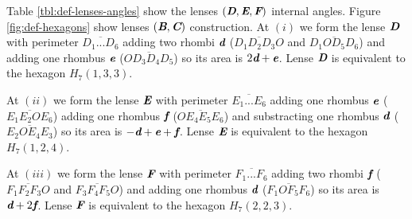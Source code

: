 \documentclass[11pt]{article}
\def\mathbi#1{\textbf{\em #1}}
\begin{document}
Table \ref{tbl:def-lenses-angles} show the lenses $(\mathbi{D},\mathbi{E},\mathbi{F})$ internal angles.
Figure \ref{fig:def-hexagons} show lenses $(\mathbi{B},\mathbi{C})$ construction.
At $(i)$ we form the lense $\mathbi{D}$ with perimeter $\overline{D_1...D_6}$ adding two rhombi $\mathbi{d}$ ($\overline{D_1D_2D_3O}$ and $\overline{D_1OD_5D_6}$) and adding one rhombus $\mathbi{e}$ ($\overline{OD_3D_4D_5}$) so its area is $2\mathbi{d} + \mathbi{e}$. Lense $\mathbi{D}$ is equivalent to the hexagon $H_7(1,3,3)$.

At $(ii)$ we form the lense $\mathbi{E}$ with perimeter $\overline{E_1...E_6}$ adding one rhombus $\mathbi{e}$ ($\overline{E_1E_2OE_6}$) adding one rhombus $\mathbi{f}$ ($\overline{OE_4E_5E_6}$) and substracting one rhombus $\mathbi{d}$ ($\overline{E_2OE_4E_3}$) so its area is $-\mathbi{d} + \mathbi{e} + \mathbi{f}$. Lense $\mathbi{E}$ is equivalent to the hexagon $H_7(1,2,4)$.

At $(iii)$ we form the lense $\mathbi{F}$ with perimeter $\overline{F_1...F_6}$ adding two rhombi $\mathbi{f}$ ($\overline{F_1F_2F_3O}$ and $\overline{F_3F_4F_5O}$) and adding one rhombus $\mathbi{d}$ ($\overline{F_1OF_5F_6}$) so its area is $\mathbi{d} + 2\mathbi{f}$. Lense $\mathbi{F}$ is equivalent to the hexagon $H_7(2,2,3)$.
\end{document}
